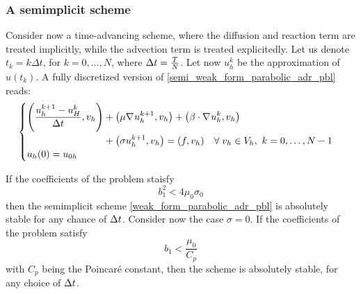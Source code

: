 \subsubsection{A semimplicit scheme}
Consider now a time-advancing scheme, where the diffusion and reaction term are treated implicitly, while the advection term is treated explicitedly. Let us denote \(t_k = k\Delta t\), for \(k = 0, \ldots, N\), where \(\Delta t = \frac{T}{N}\). Let now \(u_h^{k}\) be the approximation of \(u(t_k)\). A fully discretized version of \eqref{semi_weak_form_parabolic_adr_pbl} reads:
\begin{equation}
    \begin{cases}
        \begin{aligned}
            \left( \dfrac{u_h^{k+1}- u^k_H}{\Delta t}, v_h \right) &+ \left( \mu \nabla\mspace{1mu} u_h^{k+1}, v_h \right) + \left( \beta \cdot \nabla\mspace{1mu} u_h^{k} , v_h \right) \\
            &+ \left( \sigma u_h^{k+1}, v_h \right) = (f,v_h) \quad \forall \; v_h \in V_h, \ k = 0, \ldots, N-1
        \end{aligned} \\
        u_h(0) = u_{0h}
    \end{cases}
    \label{weak_form_parabolic_adr_pbl}
\end{equation}
\begin{theorem}
    If the coefficients of the problem staisfy 
    \begin{equation}
        b_1^2 < 4\mu_0 \sigma_0
        \label{30_slide_pbl}
    \end{equation}
    then the semimplicit scheme \eqref{weak_form_parabolic_adr_pbl} is absolutely stable for any chance of \(\Delta t\). Consider now the case \(\sigma = 0\). If the coefficients of the problem satisfy 
    \begin{equation}
        b_1 < \frac{\mu_0}{C_p}
    \end{equation}
    with \(C_p\) being the Poincaré constant, then the scheme is absolutely stable, for any choice of \(\Delta t\).
\end{theorem}
